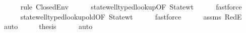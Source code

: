 \begin{isabellebody}
\ \ \ \ \isamarkupfalse%
\ {\isacharparenleft}{\kern0pt}rule\ ClosedEnv{\isacharparenright}{\kern0pt}\isanewline
\ \ \ \ \isamarkupfalse%
\ state{\isacharunderscore}{\kern0pt}well{\isacharunderscore}{\kern0pt}typed{\isacharunderscore}{\kern0pt}lookup{\isacharbrackleft}{\kern0pt}OF\ State{\isacharunderscore}{\kern0pt}wt{\isacharbrackright}{\kern0pt}\isanewline
\ \ \ \ \isamarkupfalse%
\ fastforce\isanewline
\ \ \ \ \isamarkupfalse%
\ state{\isacharunderscore}{\kern0pt}well{\isacharunderscore}{\kern0pt}typed{\isacharunderscore}{\kern0pt}lookup{\isacharunderscore}{\kern0pt}old{\isacharbrackleft}{\kern0pt}OF\ State{\isacharunderscore}{\kern0pt}wt{\isacharbrackright}{\kern0pt}\isanewline
\ \ \ \ \isamarkupfalse%
\ fastforce\isanewline
\ \ \ \ \isamarkupfalse%
\ assms\ RedE\ \isamarkupfalse%
\ auto\isanewline
\ \ \isamarkupfalse%
\ \isamarkupfalse%
\ {\isacharquery}{\kern0pt}thesis\isanewline
\ \ \ \ \isamarkupfalse%
\ auto\isanewline
{}\isamarkupfalse%
%
\endisatagproof
{\isafoldproof}%
%
\isadelimproof
\isanewline
%
\endisadelimproof
\isanewline
{}\isamarkupfalse%
\isanewline
%
\isadelimtheory
\isanewline
%
\endisadelimtheory
%
\isatagtheory
{}\isamarkupfalse%
%
\endisatagtheory
{\isafoldtheory}%
%
\isadelimtheory
%
\endisadelimtheory
%
\end{isabellebody}%
\endinput
